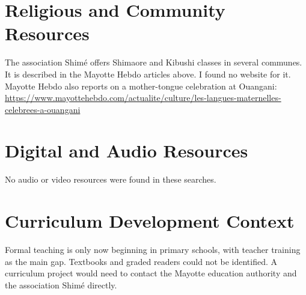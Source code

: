 \documentclass[12pt]{article}
\begin{document}
\section{Religious and Community Resources}
The association Shim\'e offers Shimaore and Kibushi classes in several communes. It is described in the Mayotte Hebdo articles above. I found no website for it. Mayotte Hebdo also reports on a mother-tongue celebration at Ouangani: \url{https://www.mayottehebdo.com/actualite/culture/les-langues-maternelles-celebrees-a-ouangani}

\section{Digital and Audio Resources}
No audio or video resources were found in these searches.

\section{Curriculum Development Context}
Formal teaching is only now beginning in primary schools, with teacher training as the main gap. Textbooks and graded readers could not be identified. A curriculum project would need to contact the Mayotte education authority and the association Shim\'e directly.
\end{document}
